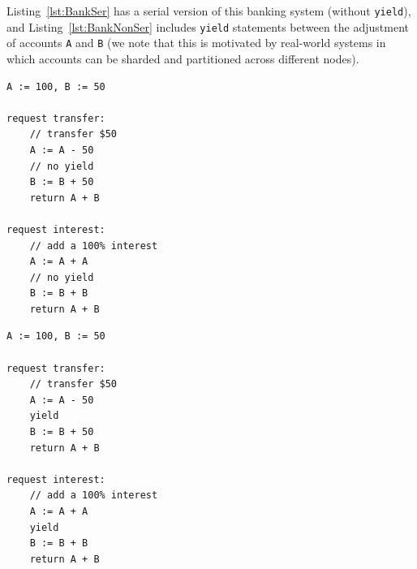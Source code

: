 Listing~\ref{lst:BankSer} has a serial version of this banking system (without \texttt{yield}), and Listing~\ref{lst:BankNonSer} includes \texttt{yield} statements between the adjustment of accounts \texttt{A} and \texttt{B} (we note that this is motivated by real-world systems in which accounts can be sharded and partitioned across different nodes).
%


\noindent
\begin{minipage}[t]{0.45\textwidth}
	\begin{lstlisting}[caption={Serializable},
		label={lst:BankSer},numbers=none]
A := 100, B := 50

request transfer: 
    // transfer $50
    A := A - 50
    // no yield
    B := B + 50
    return A + B
	
request interest: 
    // add a 100% interest
    A := A + A
    // no yield
    B := B + B
    return A + B      
			\end{lstlisting}
\end{minipage}
\hfill
\begin{minipage}[t]{0.45\textwidth}
	\begin{lstlisting}[caption={Not serializable},
		label={lst:BankNonSer},numbers=none]
A := 100, B := 50
	
request transfer: 
    // transfer $50
    A := A - 50
    yield
    B := B + 50
    return A + B

request interest: 
    // add a 100% interest
    A := A + A
    yield
    B := B + B
    return A + B
      		\end{lstlisting}
\end{minipage}
	

